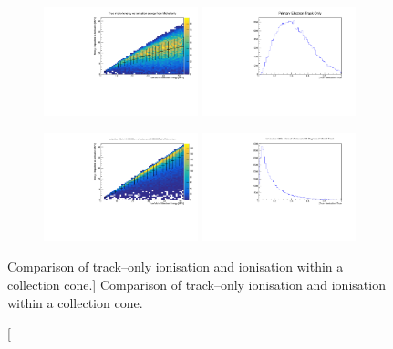 \begin{figure}
	\centering

	\begin{subfigure}{\textwidth}
		\includegraphics[clip, trim = 0cm 0cm 0cm 1cm, width=0.49\textwidth]{figures/michel_track_only.pdf}
		\includegraphics[clip, trim = 0cm 0cm 0cm 1cm, width=0.49\textwidth]{figures/track_frac.pdf}
	\end{subfigure}
	\begin{subfigure}{\textwidth}
		\includegraphics[clip, trim = 0cm 0cm 0cm 1cm, width=0.49\textwidth]{figures/cone_reco.pdf}
		\includegraphics[clip, trim = 0cm 0cm 0cm 1cm, width=0.49\textwidth]{figures/cone_frac.pdf}
	\end{subfigure}

	\caption
	[Comparison of track--only ionisation and ionisation within a collection cone.]
	{Comparison of track--only ionisation and ionisation within a collection cone.}

	\label{fig:michel_track_only}

\end{figure}

